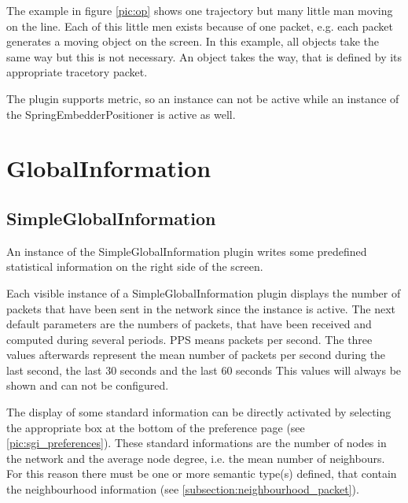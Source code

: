 The example in figure \ref{pic:op} shows one trajectory but many little man moving on the line. Each of this
little men exists because of one packet, e.g. each packet generates a moving object on the screen. In this
example, all objects take the same way but this is not necessary. An object takes the way, that is defined
by its appropriate tracetory packet.

The plugin supports metric, so an instance can not be active while an instance of the SpringEmbedderPositioner is
active as well.

\newpage
\section{GlobalInformation}

\subsection{SimpleGlobalInformation}
\label{subsection:simpleglobalinformation}

An instance of the SimpleGlobalInformation plugin writes some predefined statistical information on the right
side of the screen.

Each visible instance of a SimpleGlobalInformation plugin displays the number of packets that have been sent
in the network since the instance is active. The next default parameters are the numbers of packets, that have been
received and computed during several periods. PPS means packets per second. The three values afterwards
represent the mean number of packets per second during the last second, the last 30 seconds and the last 60 seconds
This values will always be shown and can not be configured.

The display of some standard information can be directly activated by selecting the appropriate box at the bottom
of the preference page (see \ref{pic:sgi_preferences}). These standard informations are the number of nodes in the
network and the average node degree, i.e. the mean number of neighbours. For this reason there must be one or more semantic
type(s) defined, that contain the neighbourhood information (see \ref{subsection:neighbourhood_packet}).

